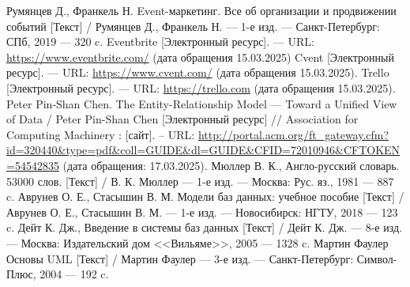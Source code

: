 \begin{thebibliography}{}
	 Румянцев Д., Франкель Н. Event-маркетинг. Все об организации и продвижении событий [Текст] / Румянцев Д., Франкель Н. — 1-е изд. — Санкт-Петербург: СПб, 2019 — 320 c.
	 Eventbrite [Электронный ресурс]. — URL:  \url{https://www.eventbrite.com/} (дата обращения 15.03.2025)
	 Cvent [Электронный ресурс]. — URL: \url{https://www.cvent.com/} (дата обращения 15.03.2025).
	 Trello [Электронный ресурс]. — URL: \url{https://trello.com} (дата обращения 15.03.2025).
	 Peter Pin-Shan Chen. The Entity-Relationship Model — Toward a Unified View of Data / Peter Pin-Shan Chen [Электронный ресурс] // Association for Computing Machinery : [сайт]. -- URL: \url{http://portal.acm.org/ft_gateway.cfm?id=320440&type=pdf&coll=GUIDE&dl=GUIDE&CFID=72010946&CFTOKEN=54542835} (дата обращения: 17.03.2025).
	 Мюллер В. К., Англо-русский словарь. 53000 слов. [Текст] / В. К. Мюллер — 1-е изд. — Москва: Рус. яз., 1981 — 887 c.
	 Аврунев О. Е., Стасышин В. М. Модели баз данных: учебное пособие [Текст] / Аврунев О. Е., Стасышин В. М. — 1-е изд. — Новосибирск: НГТУ, 2018 — 123 c.
	 Дейт К. Дж., Введение в системы баз данных [Текст] / Дейт К. Дж. — 8-е изд. — Москва: Издательский дом <<Вильяме>>, 2005 — 1328 c.
	 Мартин Фаулер Основы UML [Текст] / Мартин Фаулер — 3-е изд. — Санкт-Петербург: Символ-Плюс, 2004 — 192 c.
\end{thebibliography}
